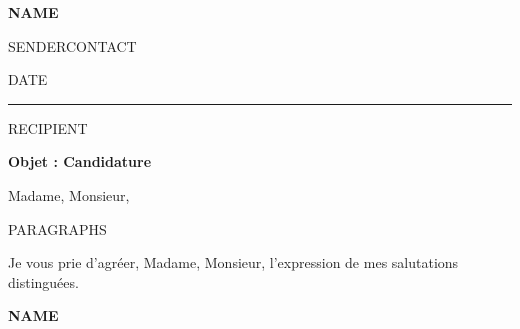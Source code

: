 \documentclass[11pt,a4paper]{article}
\begin{document}
\noindent
{\LARGE\bfseries\color{ink} {{NAME}}}\par
\vspace{0.1em}
{\small\color{ink} {{SENDERCONTACT}}}\par
\vspace{0.15em}
{\small\color{accent} {{DATE}}}\par
\vspace{0.4em}

\noindent
{\color{accent}\rule{\textwidth}{0.6pt}}\par
\vspace{0.8em}

\noindent
{{RECIPIENT}}

\vspace{1.6em}
\noindent
{\bfseries Objet : Candidature}\par
\vspace{0.4em}
\noindent
Madame, Monsieur,

{{PARAGRAPHS}}

\vspace{1.4em}
\noindent
Je vous prie d'agr\'eer, Madame, Monsieur, l'expression de mes salutations distingu\'ees.
\vspace{2em}

\noindent
{\bfseries {{NAME}}}
\end{document}
